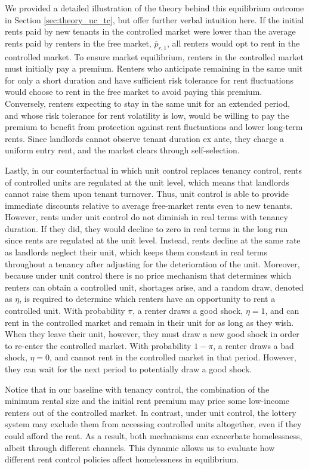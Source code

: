 \documentclass[parskip=full]{article}
\begin{document}
We provided a detailed illustration of the theory behind this equilibrium outcome in Section \ref{sec:theory_uc_tc}, but offer further verbal intuition here. If the initial rents paid by new tenants in the controlled market were lower than the average rents paid by renters in the free market, $\overline{p}_{r,1}$, all renters would opt to rent in the controlled market. To ensure market equilibrium, renters in the controlled market must initially pay a premium. Renters who anticipate remaining in the same unit for only a short duration and have sufficient risk tolerance for rent fluctuations would choose to rent in the free market to avoid paying this premium. Conversely, renters expecting to stay in the same unit for an extended period, and whose risk tolerance for rent volatility is low, would be willing to pay the premium to benefit from protection against rent fluctuations and lower long-term rents. Since landlords cannot observe tenant duration ex ante, they charge a uniform entry rent, and the market clears through self-selection.

Lastly, in our counterfactual in which unit control replaces tenancy control, rents of controlled units are regulated at the unit level, which means that landlords cannot raise them upon tenant turnover. Thus, unit control is able to provide immediate discounts relative to average free-market rents even to new tenants. However, rents under unit control do not diminish in real terms with tenancy duration. If they did, they would decline to zero in real terms in the long run since rents are regulated at the unit level. Instead, rents decline at the same rate as landlords neglect their unit, which keeps them constant in real terms throughout a tenancy after adjusting for the deterioration of the unit. Moreover, because under unit control there is no price mechanism that determines which renters can obtain a controlled unit, shortages arise, and a random draw, denoted as $\eta$, is required to determine which renters have an opportunity to rent a controlled unit. With probability $\pi$, a renter draws a good shock, $\eta=1$, and can rent in the controlled market and remain in their unit for as long as they wish. When they leave their unit, however, they must draw a new good shock in order to re-enter the controlled market. With probability $1-\pi$, a renter draws a bad shock, $\eta=0$, and cannot rent in the controlled market in that period. However, they can wait for the next period to potentially draw a good shock.

Notice that in our baseline with tenancy control, the combination of the minimum rental size and the initial rent premium may price some low-income renters out of the controlled market. In contrast, under unit control, the lottery system may exclude them from accessing controlled units altogether, even if they could afford the rent. As a result, both mechanisms can exacerbate homelessness, albeit through different channels. This dynamic allows us to evaluate how different rent control policies affect homelessness in equilibrium.
\end{document}
